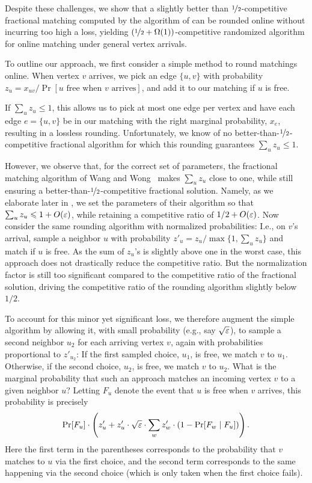 Despite these challenges, we show that a slightly better than $\nicefrac{1}{2}$-competitive fractional matching computed by the algorithm of \cite{wang2015two} can be rounded online without incurring too high a loss, yielding $(\nicefrac{1}{2}+\Omega(1))$-competitive randomized algorithm for online matching under general vertex arrivals.

To outline our approach, we first consider a simple method to round matchings online. When vertex $v$ arrives, we pick an edge $\{u,v\}$ with probability $z_u = x_{uv}/\Pr[u \mbox{ free when $v$ arrives}]$, and add it to our matching if $u$ is free.

If $\sum_u z_u \leq 1$, this allows us to pick at most one edge per vertex and have each edge $e=\{u,v\}$ be in our matching with the right marginal probability, $x_e$, resulting in a lossless rounding. Unfortunately, we know of no better-than-$\nicefrac12$-competitive fractional algorithm for which this rounding guarantees $\sum_u z_u \leq 1$.

However, we observe that, for the correct set of parameters, the fractional matching algorithm of
Wang and Wong~\cite{wang2015two} makes $\sum_u z_u$ close to one, while still ensuring a better-than-$\nicefrac{1}{2}$-competitive fractional solution. 
Namely, as we elaborate later in , we set the parameters of their algorithm so that $\sum_u z_u \leqslant 1 + O(\varepsilon)$, while retaining a competitive ratio of $1/2 + O(\varepsilon)$.
Now consider the same rounding algorithm with normalized probabilities: I.e., on $v$'s 
arrival, sample a neighbor $u$ with probability $z'_u = z_u/\max\{1, \sum_u z_u\}$ and match if $u$ is free. 
As the sum of $z_u$'s is slightly above one in the worst case, this approach does not drastically reduce the 
competitive ratio. 
But the normalization factor is still too significant compared to the competitive ratio of the fractional solution, 
driving the competitive ratio of the rounding algorithm slightly below $1/2$.

To account for this minor yet significant loss, we therefore augment the simple algorithm by allowing it, 
with small probability (e.g., say $\sqrt{\varepsilon}$), to sample a second neighbor $u_2$ for each arriving vertex $v$, 
again with probabilities proportional to $z'_{u_2}$:
If the first sampled choice, $u_1$, is free, we match $v$ to $u_1$. Otherwise, if the second choice, $u_2$, 
is free, we match $v$ to $u_2$. 
What is the marginal probability that such an approach matches an incoming vertex $v$ to a given neighbor $u$? Letting $F_u$ denote the event that  $u$ is free when $v$ arrives, this probability is precisely
\begin{equation}\label{eq:03hg329hg}
  \Pr[F_u] \cdot \left(z'_{u} + z'_u\cdot \sqrt{\varepsilon} \cdot \sum_{w} z'_w \cdot (1-\Pr[F_w \mid F_u])  \right).
\end{equation}
Here the first term in the parentheses corresponds to the probability that $v$ matches to $u$ via the first choice, 
and the second term corresponds to the same happening via the second choice (which is only taken when the first choice 
fails). 

